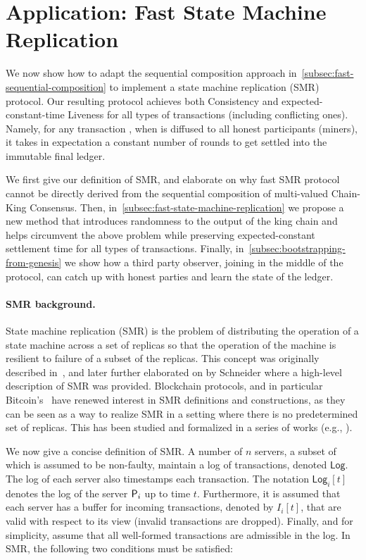 \section{Application: Fast State Machine Replication}
\label{sec:fast-state-machine-replication}

We now show how to adapt the sequential composition approach in~\cref{subsec:fast-sequential-composition} to implement a state machine replication (SMR) protocol.
%
Our resulting protocol achieves both Consistency and expected-constant-time Liveness for all types of transactions (including conflicting ones).
%
Namely, for any transaction \tx, when \tx is diffused to all honest participants (miners), it takes in expectation a constant number of rounds to get settled into the immutable final ledger.

We first give our definition of SMR, and elaborate on why fast SMR protocol cannot be directly derived from the sequential composition of multi-valued Chain-King Consensus.
%
Then, in~\cref{subsec:fast-state-machine-replication} we propose a new method that introduces randomness to the output of the king chain and helps circumvent the above problem while preserving expected-constant settlement time for all types of transactions.
%
Finally, in~\cref{subsec:bootstrapping-from-genesis} we show how a third party observer, joining in the middle of the protocol, can catch up with honest parties and learn the state of the ledger.

\paragraph{SMR background.}
%
State machine replication (SMR) is the problem of distributing the operation of a state machine across a set of replicas so that the operation of the machine is resilient to failure of a subset of the replicas.
%
This concept was originally described in~\cite{CACM:Lamport78},
%
and later further elaborated on by Schneider \cite{CSUR:Schneider90} where a high-level description of SMR was provided.
%
Blockchain protocols, and in particular Bitcoin's~\cite{Nak08} have renewed interest in SMR definitions and constructions, as they can be seen as a way to realize SMR in a setting where there is no predetermined set of replicas.
%
This has been studied and formalized in a series of works (e.g., \cite{EPRINT:GarKiaLeo14,EC:PasSeeash17,RSA:GarKia20}).

We now give a concise definition of SMR.
%
A number of $n$ servers, a subset \honestPartySet of which is assumed to be non-faulty, maintain a log of transactions, denoted $\mathsf{Log}$.
%
The log of each server also timestamps each transaction.
%
The notation $\mathsf{Log}_i[t]$  denotes the log of the server $\mathsf{P}_i$ up to time $t$.
%
Furthermore, it is assumed that each server has a buffer for incoming transactions, denoted by $I_i[t]$, that are valid with respect to its view (invalid transactions are dropped).
%
Finally, and for simplicity, assume that all well-formed transactions are admissible in the log. In SMR, the following two conditions must be satisfied:

